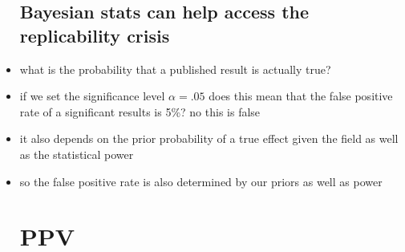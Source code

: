 \documentclass{article}
\begin{document}
\begin{itemize}
\subsection{Bayesian stats can help access the replicability  crisis }
\item what is the probability that a published result is actually true?
\item if we set the significance level $\alpha=.05$ does this mean that the false positive rate of a significant results is 5\%? no this is false 
\item it also depends on the prior probability of a true effect given the field as well as the statistical power
\item so the false positive rate is also determined by our priors as well as power
\section{PPV}

\end{itemize}
\end{document}
